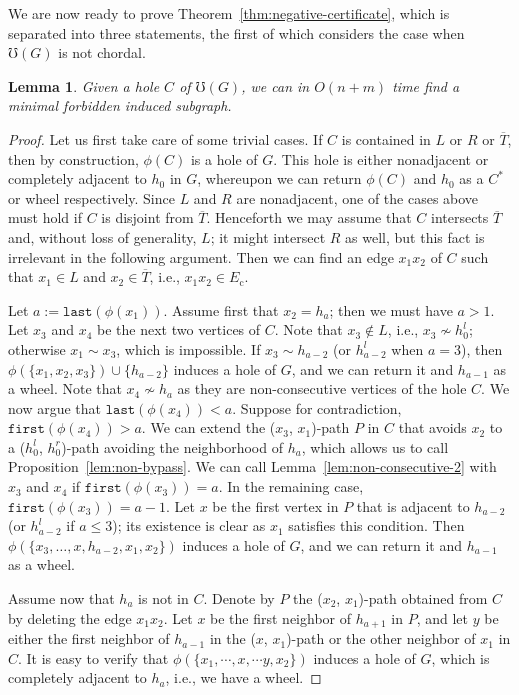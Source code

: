 \documentclass[10pt]{article}
\newtheorem{lemma}[theorem]{Lemma}
\newcommand{\badgraph}{minimal forbidden induced subgraph}
\newcommand{\head}[1]{\ensuremath{{\mathtt{last}(#1)}}}
\newcommand{\tail}[1]{\ensuremath{{\mathtt{first}(#1)}}}
\newcommand{\stpath}[2]{($#1$, $#2$)-path}
\newcommand{\ec}{\ensuremath{E_{\text{c}}}}
\newcommand{\oo}{\ensuremath{T}}
\newcommand{\og}[1]{\ensuremath{\phi(#1)}}
\begin{document}
We are now ready to prove Theorem~\ref{thm:negative-certificate}, which
is separated into three statements, the first of which considers the
case when $\mho(G)$ is not chordal.
\begin{lemma}\label{lem:hole}
  Given a hole $C$ of $\mho(G)$, we can in $O(n+m)$ time find a
  \badgraph.
\end{lemma}
\begin{proof}
  Let us first take care of some trivial cases.  If $C$ is contained
  in $L$ or $R$ or $\overline{\oo}$, then by construction, \og{C} is a
  hole of $G$.  This hole is either nonadjacent or completely adjacent
  to $h_0$ in $G$, whereupon we can return \og{C} and $h_0$ as a $C^*$
  or wheel respectively.  Since $L$ and $R$ are nonadjacent, one of
  the cases above must hold if $C$ is disjoint from $\overline{\oo}$.
  Henceforth we may assume that $C$ intersects $\overline{\oo}$ and,
  without loss of generality, $L$; it might intersect $R$ as well, but
  this fact is irrelevant in the following argument.  Then we can find
  an edge $x_1 x_2$ of $C$ such that $x_1\in L$ and $x_2\in
  \overline{\oo}$, i.e., $x_1 x_2\in \ec$.

  Let $a := {\head{\og{x_1}}}$.  Assume first that $x_2 = h_a$; then
  we must have $a > 1$.  Let $x_3$ and $x_4$ be the next two vertices
  of $C$.  Note that $x_3\not\in L$, i.e., $x_3\not\sim h^l_0$;
  otherwise $x_1\sim x_3$, which is impossible.  If $x_3\sim h_{a -
    2}$ (or $h^l_{a - 2}$ when $a = 3$), then
  $\og{\{x_1,x_2,x_3\}}\cup \{h_{a - 2}\}$ induces a hole of $G$, and
  we can return it and $h_{a-1}$ as a wheel.  Note that $x_4 \not\sim
  h_{a}$ as they are non-consecutive vertices of the hole $C$.  We now
  argue that $\head{\og{x_4}}< a$.  Suppose for contradiction,
  $\tail{\og{x_4}} > a$.  We can extend the \stpath{x_3}{x_1} $P$ in
  $C$ that avoids $x_2$ to a \stpath{h^l_0}{h^r_0} avoiding the
  neighborhood of $h_a$, which allows us to call
  Proposition~\ref{lem:non-bypass}.  We can call
  Lemma~\ref{lem:non-consecutive-2} with $x_3$ and $x_4$ if
  $\tail{\og{x_3}} = a$.  In the remaining case, $\tail{\og{x_3}} = a
  - 1$.  Let $x$ be the first vertex in $P$ that is adjacent to
  $h_{a-2}$ (or $h^l_{a-2}$ if $a\le 3$); its existence is clear as
  $x_1$ satisfies this condition.  Then $\og{\{x_3, \dots, x, h_{a-2},
    x_1, x_2\}}$ induces a hole of $G$, and we can return it and
  $h_{a-1}$ as a wheel.

  Assume now that $h_a$ is not in $C$.  Denote by $P$ the
  \stpath{x_2}{x_1} obtained from $C$ by deleting the edge $x_1 x_2$.
  Let $x$ be the first neighbor of $h_{a+1}$ in $P$, and let $y$ be
  either the first neighbor of $h_{a-1}$ in the \stpath{x}{x_1} or the
  other neighbor of $x_1$ in $C$.  It is easy to verify that
  $\og{\{x_1, \cdots, x, \cdots y, x_2\}}$ induces a hole of $G$,
  which is completely adjacent to $h_a$, i.e., we have a wheel.
\end{proof}
\end{document}

